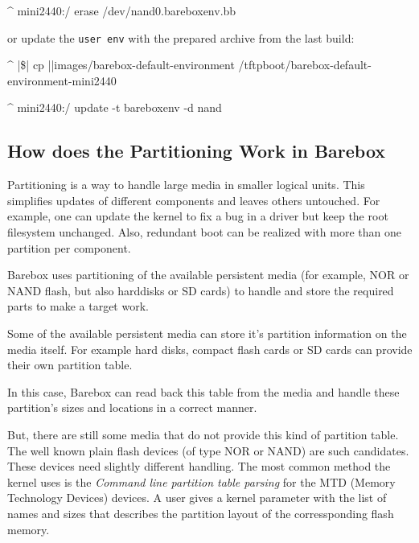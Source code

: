 \begin{ptxshell}[escapechar=|]{^}
mini2440:/ erase /dev/nand0.bareboxenv.bb
\end{ptxshell}

or update the \texttt{user env} with the prepared archive from the last build:

\begin{ptxshell}[escapechar=|]{^}
|\$| cp |\ptxdistPlatformDir |images/barebox-default-environment /tftpboot/barebox-default-environment-mini2440
\end{ptxshell}

\begin{ptxshell}[escapechar=|]{^}
mini2440:/ update -t bareboxenv -d nand
\end{ptxshell}



\subsection{How does the Partitioning Work in Barebox}	\label{sec:bbpartitioning}

Partitioning is a way to handle large media in smaller logical units. This
simplifies updates of different components and leaves others untouched. For
example, one can update the kernel to fix a bug in a driver but keep the
root filesystem unchanged. Also, redundant boot can be realized with more than
one partition per component.

%
%

Barebox uses partitioning of the available persistent media (for example, NOR
or NAND flash, but also harddisks or SD cards) to handle and store the
required parts to make a target work.

Some of the available persistent media can store it's partition information on
the media itself. For example hard disks, compact flash cards or SD cards can
provide their own partition table.

In this case, Barebox can read back this table from the media and handle
these partition's sizes and locations in a correct manner.

But, there are still some media that do not provide this kind of partition table.
The well known plain flash devices (of type NOR or NAND) are such candidates.
These devices need slightly different handling. The most common method the
kernel uses is the \textit{Command line partition table parsing} for the MTD
(Memory Technology Devices) devices. A user gives a kernel parameter with the
list of names and sizes that describes the partition layout of the
corressponding flash memory.

